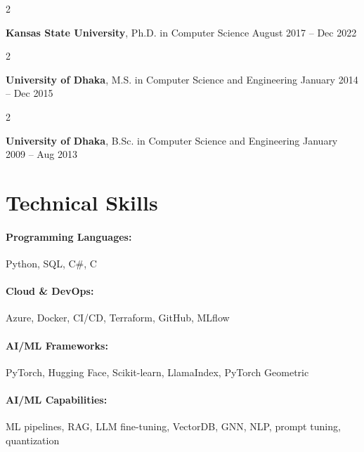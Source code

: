 \documentclass[10pt, letterpaper]{article}
\newenvironment{twocolentry}[2][]{
    \onecolentry
    \def\secondColumn{#2}
    \setcolumnwidth{\fill, 4.5 cm}
    \begin{paracol}{2}
}{
    \switchcolumn \raggedleft \secondColumn
    \end{paracol}
    \endonecolentry
} %
\begin{document}
        \begin{twocolentry}{
            August 2017 -- Dec 2022
        }
            \textbf{Kansas State University}, Ph.D. in Computer Science\end{twocolentry}

        \begin{twocolentry}{
            January 2014 -- Dec 2015
        }
            \textbf{University of Dhaka}, M.S. in Computer Science and Engineering\end{twocolentry}

        \begin{twocolentry}{
            January 2009 -- Aug 2013
        }
            \textbf{University of Dhaka}, B.Sc. in Computer Science and Engineering\end{twocolentry}

\vspace{-1mm}
\section{Technical Skills}

        \paragraph{Programming Languages:} Python, SQL, C\#, C
        \vspace{-4mm}
        \paragraph{Cloud \& DevOps:} Azure, Docker, CI/CD, Terraform, GitHub, MLflow
        \vspace{-4mm}
        \paragraph{AI/ML Frameworks:} PyTorch, Hugging Face, Scikit-learn, LlamaIndex, PyTorch Geometric
        \vspace{-4mm}
        \paragraph{AI/ML Capabilities:} ML pipelines, RAG, LLM fine-tuning, VectorDB, GNN, NLP, prompt tuning, quantization
\end{document}
